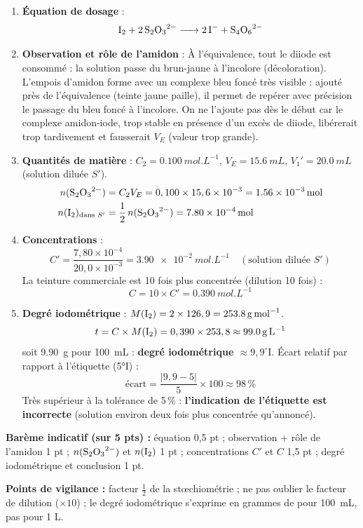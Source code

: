 \documentclass[11pt]{article}
\newcommand{\cle}[1]{{\popxbold\color{popdark}#1}}
\begin{document}
\begin{corrige}
\begin{enumerate}
\item \textbf{Équation de dosage} :
\[ \ce{I2 + 2S2O3^2- -> 2I- + S4O6^2-} \]
\item \textbf{Observation et rôle de l'amidon} : À l'équivalence, tout le diiode est consommé : la solution passe du brun-jaune à l'\cle{incolore} (décoloration). L'empois d'amidon forme avec  un complexe bleu foncé très visible : ajouté près de l'équivalence (teinte jaune paille), il permet de repérer avec précision le passage du bleu foncé à l'incolore. On ne l'ajoute pas dès le début car le complexe amidon-iode, trop stable en présence d'un excès de diiode, libérerait  trop tardivement et fausserait $V_E$ (valeur trop grande).
\item \textbf{Quantités de matière} : $C_2 = \SI{0,100}{mol.L^{-1}}$, $V_E = \SI{15,6}{mL}$, $V_1' = \SI{20,0}{mL}$ (solution diluée $S'$).
\begin{align*}
n(\ce{S2O3^2-}) &= C_2 V_E = 0,100 \times 15,6\times10^{-3} = \SI{1,56e-3}{mol} \\
n(\ce{I2})_{\text{dans } S'} &= \frac{1}{2}\,n(\ce{S2O3^2-}) = \SI{7,80e-4}{mol}
\end{align*}
\item \textbf{Concentrations} :
\[ C' = \frac{7,80\times10^{-4}}{20,0\times10^{-3}} = \SI{3,90e-2}{mol.L^{-1}} \quad (\text{solution diluée } S') \]
La teinture commerciale est 10 fois plus concentrée (dilution 10 fois) :
\[ C = 10 \times C' = \SI{0,390}{mol.L^{-1}} \]
\item \textbf{Degré iodométrique} : $M(\ce{I2}) = 2 \times 126,9 = \SI{253,8}{g.mol^{-1}}$.
\[ t = C \times M(\ce{I2}) = 0,390 \times 253,8 \approx \SI{99,0}{g.L^{-1}} \]
soit \SI{9,90}{g} pour \SI{100}{mL} : \textbf{degré iodométrique $\approx 9,9^\circ\text{I}$}.
Écart relatif par rapport à l'étiquette (5°I) :
\[ \text{écart} = \frac{|9,9 - 5|}{5} \times 100 \approx 98\,\% \]
Très supérieur à la tolérance de 5\,\% : \textbf{l'indication de l'étiquette est incorrecte} (solution environ deux fois plus concentrée qu'annoncé).
\end{enumerate}
\textbf{Barème indicatif (sur 5 pts) :} équation 0,5 pt ; observation + rôle de l'amidon 1 pt ; $n(\ce{S2O3^2-})$ et $n(\ce{I2})$ 1 pt ; concentrations $C'$ et $C$ 1,5 pt ; degré iodométrique et conclusion 1 pt.

\textbf{Points de vigilance :} facteur $\frac{1}{2}$ de la stœchiométrie ; ne pas oublier le facteur de dilution ($\times 10$) ; le degré iodométrique s'exprime en grammes de  pour \SI{100}{mL}, pas pour 1 L.
\end{corrige}
\end{document}
